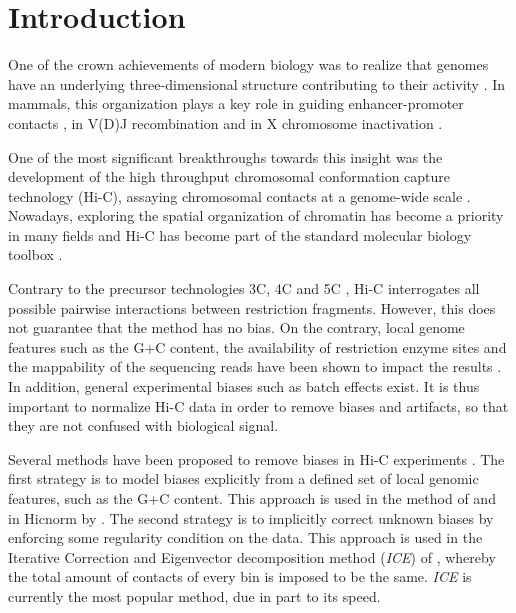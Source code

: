 \documentclass{bioinfo}
\begin{document}
\maketitle






\section{Introduction}

One of the crown achievements of modern biology was to realize that
genomes have an underlying three-dimensional structure contributing to
their activity \citep{rowley2016three}. In mammals, this organization
plays a key role in guiding enhancer-promoter contacts
\citep{de2013topology}, in V(D)J recombination \citep{choi2014ctcf} and in
X chromosome inactivation \citep{galupa2015x}.

One of the most significant breakthroughs towards this insight was the
development of the high throughput chromosomal conformation capture
technology (Hi-C), assaying chromosomal contacts at a genome-wide scale
\citep{lieberman2009comprehensive}. Nowadays, exploring the spatial
organization of chromatin has become a priority in many fields and Hi-C
has become part of the standard molecular biology toolbox
\citep{denker2016second}.

Contrary to the precursor technologies 3C, 4C and 5C \citep{de2012decade},
Hi-C interrogates all possible pairwise interactions between restriction
fragments. However, this does not guarantee that the method has no bias.
On the contrary, local genome features such as the G+C content, the
availability of restriction enzyme sites and the mappability of the
sequencing reads have been shown to impact the results
\citep{yaffe2011probabilistic}. In addition, general experimental biases
such as batch effects exist. It is thus important to normalize Hi-C data in
order to remove biases and artifacts, so that they are not confused with
biological signal.

Several methods have been proposed to remove biases in Hi-C experiments
\citep{schmitt2016genome}. The first strategy is to model biases
explicitly from a defined set of local genomic features, such as the G+C
content. This approach is used in the method of
\cite{yaffe2011probabilistic} and in Hicnorm by \cite{hu2012hicnorm}. The
second strategy is to implicitly correct unknown biases by enforcing some
regularity condition on the data. This approach is used in the
Iterative Correction and Eigenvector decomposition method (\textit{ICE})
of \cite{imakaev2012iterative}, whereby the total amount of contacts of
every bin is imposed to be the same. \textit{ICE} is currently the most
popular method, due in part to its speed.
\end{document}
